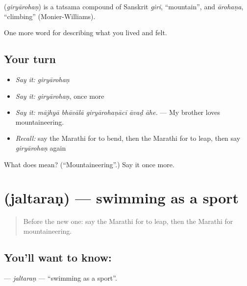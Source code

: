 \begin{cousinweb}
\textbf{} (\emph{giryārohaṇ}) is a tatsama compound of Sanskrit \emph{giri}, \textquotedblleft{}mountain\textquotedblright{}, and \emph{ārohaṇa}, \textquotedblleft{}climbing\textquotedblright{} (Monier-Williams).
\end{cousinweb}

\begin{grammarlens}[title={What you've built}]
One more word for describing what you lived and felt.
\end{grammarlens}

\subsection*{Your turn}
\begin{itemize}
\raggedright
  \item \emph{Say it:} \emph{giryārohaṇ}
  \item \emph{Say it:} \emph{giryārohaṇ}, once more
  \item \emph{Say it:} \emph{mājhyā bhāvālā giryārohaṇācī āvaḍ āhe.} — My brother loves mountaineering.
  \item \emph{Recall:} say the Marathi for to bend, then the Marathi for to leap, then say \emph{giryārohaṇ} again
\end{itemize}

\begin{tcolorbox}[breakable,colback=teal!4,colframe=teal!35!black,title={Before you move on}]
What does  mean? (\textquotedblleft{}Mountaineering\textquotedblright{}.) Say it once more.
\end{tcolorbox}
\section[\texorpdfstring{\mr{जलतरण} (jaltaraṇ)}{जलतरण (jaltaraṇ)}]{ (jaltaraṇ) — swimming as a sport}

\label{lesson:MR-C534-jaltaran}



\begin{quote}
Before the new one: say the Marathi for to leap, then the Marathi for mountaineering.
\end{quote}

\subsection*{You'll want to know: }
\textbf{} — \emph{jaltaraṇ} — \textquotedblleft{}swimming as a sport\textquotedblright{}.

